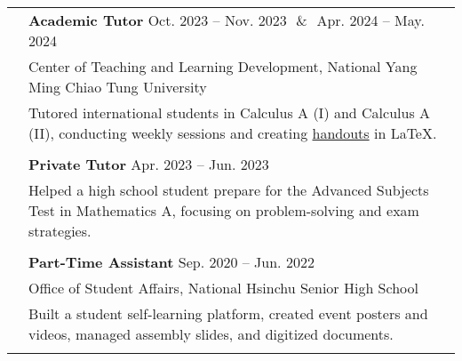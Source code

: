 \documentclass[letterpaper, 11pt]{article}
\begin{document}
\begin{center}
\begin{longtable}{p{0.76in}p{5.93in}}
        & \textbf{Academic Tutor} \hfill Oct. 2023 -- Nov. 2023\ \,\&\ \,Apr. 2024 -- May. 2024\\
        & Center of Teaching and Learning Development, National Yang Ming Chiao Tung University\\
        & Tutored international students in Calculus A (I) and Calculus A (II), conducting weekly sessions and creating \href{https://github.com/eiken59/2024_II_Tutor}{handouts} in \LaTeX.\\
        & \\

        & \textbf{Private Tutor} \hfill Apr. 2023 -- Jun. 2023 \\
        & Helped a high school student prepare for the Advanced Subjects Test in Mathematics A, focusing on problem-solving and exam strategies.\\
        & \\

        & \textbf{Part-Time Assistant} \hfill Sep. 2020 -- Jun. 2022 \\
        & Office of Student Affairs, National Hsinchu Senior High School\\
        & Built a student self-learning platform, created event posters and videos, managed assembly slides, and digitized documents.\\
        & \\



        
        
    \end{longtable}
\end{center}
\end{document}
